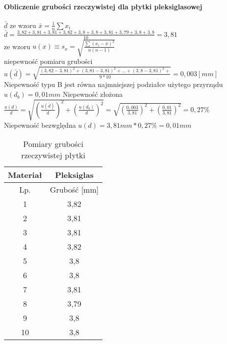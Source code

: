 \documentclass[a4paper,10pt,twoside]{article}
\begin{document}
		\paragraph{Obliczenie grubości rzeczywistej dla płytki pleksiglasowej}
		$\bar{d}$ ze wzoru $\bar{x} = \frac{1}{n} \sum x_i$ \\
		$\bar{d} = \frac{3,82 +
			3,81 +
			3,81 +
			3,82 +
			3,8 +
			3,8 + 
			3,81 +
			3,79 +
			3,8 +			
			3,8}{10} = 3,81
		$ \\
		ze wzoru $u(x) \equiv s_x = \sqrt{\frac{\sum(x_i - \bar{x})^2}{n(n-1)}}$ \\niepewność pomiaru grubości\\ $u(\bar{d}) = \sqrt{\frac{(3,82-3,81)^2 + (3,81 - 3,81)^2 + ... +(3,8 - 3,81)^2 +}{9*10}} = 0,003[mm] $
		\\ Niepewność typu B jest równa najmniejszej podziałce użytego przyrządu $u(d_b)= 0,01mm$
		Niepewność złożona $\frac{u(d)}{d} = \sqrt{(\frac{u(\bar{d})}{d})^2 + (\frac{u(d_b)}{d})^2} =\sqrt{(\frac{0,003}{3,81})^2 + (\frac{0,01}{3,81})^2} = 0,27\%$
		\\Niepewność bezwględna $u(d) = 3,81mm * 0,27\% = 0,01mm$  
		\begin{table}[!htbp]
			\caption{Pomiary grubości rzeczywistej płytki}
			\begin{center}
			\begin{tabular}{|c|c|}
				\hline
				Materiał & Pleksiglas \\ \hline
				Lp. & Grubość {[}mm{]} \\ \hline
				1 & 3,82 \\ \hline
				2 & 3,81 \\ \hline
				3 & 3,81 \\ \hline
				4 & 3,82 \\ \hline
				5 & 3,8 \\ \hline
				6 & 3,8 \\ \hline
				7 & 3,81 \\ \hline
				8 & 3,79 \\ \hline
				9 & 3,8 \\ \hline
				10 & 3,8 \\ \hline
			\end{tabular}
		\end{center}
		\end{table}
\end{document}
